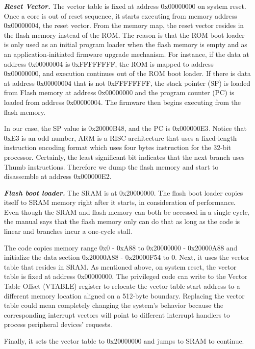 \textbf{\textit{Reset Vector.}} The vector table is fixed at address 0x00000000 on system reset. Once a core is out of reset sequence, it starts executing from memory address 0x00000004, the reset vector.  From the memory map, the reset vector resides in the flash memory instead of the ROM. The reason is that the ROM boot loader is only used as an initial program loader when the flash memory is empty and as an application-initiated firmware upgrade mechanism. For instance, if the data at address 0x00000004 is 0xFFFFFFFF, the ROM is mapped to address 0x00000000, and execution continues out of the ROM boot loader. If there is data at address 0x00000004 that is not 0xFFFFFFFF, the stack pointer (SP) is loaded from Flash memory at address 0x00000000 and the program counter (PC) is loaded from address 0x00000004. The firmware then begins executing from the flash memory.


In our case, the SP value is 0x20000B48, and the PC is 0x000000E3. Notice that 0xE3 is an odd number, ARM is a RISC architecture that uses a fixed-length instruction encoding format which uses four bytes instruction for the 32-bit processor. Certainly, the least significant bit indicates that the next branch uses Thumb instructions. Therefore we dump the flash memory and start to disassemble at address 0x000000E2.

\textbf{\textit{Flash boot loader.}} The SRAM is at 0x20000000. The flash boot loader copies itself to SRAM memory right after it starts, in consideration of performance. Even though the SRAM and flash memory can both be accessed in a single cycle, the manual says that the flash memory only can do that as long as the code is linear and branches incur a one-cycle stall. 

The code copies memory range 0x0 - 0xA88 to 0x20000000 - 0x20000A88 and initialize the data section 0x20000A88 - 0x20000F54 to 0.  Next, it uses the vector table that resides in SRAM. As mentioned above, on system reset, the vector table is fixed at address 0x00000000. The privileged code can write to the Vector Table Offset (VTABLE) register to relocate the vector table start address to a different memory location aligned on a 512-byte boundary. Replacing the vector table could mean completely changing the system's behavior because the corresponding interrupt vectors will point to different interrupt handlers to process peripheral devices' requests.


Finally, it sets the vector table to 0x20000000 and jumps to SRAM to continue.



